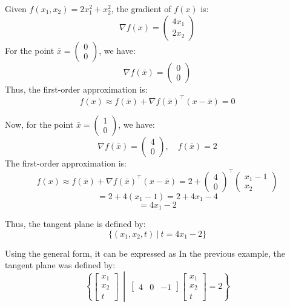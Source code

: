     \begin{example}
        Given $f(x_1, x_2) = 2x_1^2 + x_2^2$, the gradient of $f(x)$ is:
        \[
        \nabla f(x) = \begin{pmatrix} 4x_1 \\ 2x_2 \end{pmatrix}
        \]
        For the point $\bar{x} = \begin{pmatrix} 0 \\ 0 \end{pmatrix}$, we have:
        \[
        \nabla f(\bar{x}) = \begin{pmatrix} 0 \\ 0 \end{pmatrix}
        \]
        Thus, the first-order approximation is:
        \[
        f(x) \approx f(\bar{x}) + \nabla f(\bar{x})^\top (x - \bar{x}) = 0
        \]


        Now, for the point $\bar{x} = \begin{pmatrix} 1 \\ 0 \end{pmatrix}$, we have:
        \[
        \nabla f(\bar{x}) = \begin{pmatrix} 4 \\ 0 \end{pmatrix}, \quad f(\bar{x}) = 2
        \]
        The first-order approximation is:
        \[
        f(x) \approx f(\bar{x}) + \nabla f(\bar{x})^\top (x - \bar{x}) 
        = 2 + \begin{pmatrix} 4 \\ 0 \end{pmatrix}^\top \begin{pmatrix} x_1 - 1 \\ x_2 \end{pmatrix}
        \]
        \[
        = 2 + 4(x_1 - 1) = 2 + 4x_1 - 4
        \]
        \[
        = 4x_1 - 2
        \]

        Thus, the tangent plane is defined by:
        \[
        \{(x_1, x_2, t) \ | \ t = 4x_1 - 2\}
        \]

        Using the general form, it can be expressed as
        In the previous example, the tangent plane was defined by:
        \[
        \left\{
        \begin{bmatrix} x_1 \\ x_2 \\ t \end{bmatrix} 
        \ \middle| \ 
        \begin{bmatrix} 4 & 0 & -1 \end{bmatrix}
        \begin{bmatrix} x_1 \\ x_2 \\ t \end{bmatrix} 
        = 2
        \right\}
        \]

    \end{example}

